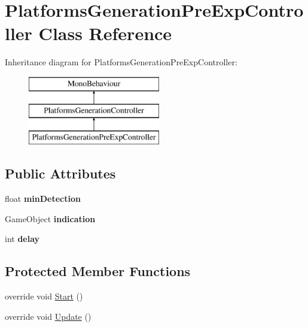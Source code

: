 \hypertarget{class_platforms_generation_pre_exp_controller}{}\section{Platforms\+Generation\+Pre\+Exp\+Controller Class Reference}
\label{class_platforms_generation_pre_exp_controller}
Inheritance diagram for Platforms\+Generation\+Pre\+Exp\+Controller\+:\begin{figure}[H]
\begin{center}
\leavevmode
\includegraphics[height=3.000000cm]{class_platforms_generation_pre_exp_controller}
\end{center}
\end{figure}
\subsection*{Public Attributes}
\begin{DoxyCompactItemize}
\item 
\mbox{\label{class_platforms_generation_pre_exp_controller_a40e6cff94e9df90461a55486e587a578}} 
float {\bfseries min\+Detection}
\item 
\mbox{\label{class_platforms_generation_pre_exp_controller_ac6aa599589d9bd82c6ea65cec614e1b1}} 
Game\+Object {\bfseries indication}
\item 
\mbox{\label{class_platforms_generation_pre_exp_controller_a4489589dad412b45aeceab9162f36177}} 
int {\bfseries delay}
\end{DoxyCompactItemize}
\subsection*{Protected Member Functions}
\begin{DoxyCompactItemize}
\item 
override void \mbox{\hyperlink{class_platforms_generation_pre_exp_controller_a839b8a8e2ce74f9388aae0a4f937b836}{Start}} ()
\item 
override void \mbox{\hyperlink{class_platforms_generation_pre_exp_controller_a21734bbe5479a03708e00e308ca384cb}{Update}} ()
\end{DoxyCompactItemize}
